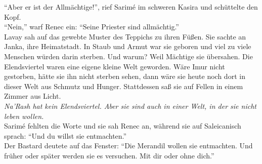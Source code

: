 ``Aber er ist der Allmächtige!'', rief Sarimé im schweren Kasira und schüttelte den Kopf.\\
``Nein,'' warf Renec ein: ``Seine Priester sind allmächtig.''\\
Lavay sah auf das gewebte Muster des Teppichs zu ihren Füßen. Sie sachte an Janka, ihre 
Heimatstadt. In Staub und Armut war sie geboren und viel zu viele Menschen würden darin sterben. 
Und warum? Weil Mächtige sie übersahen. Die Elendsviertel waren eine eigene kleine Welt geworden. 
Wäre Imur nicht gestorben, hätte sie ihn nicht sterben sehen, dann wäre sie heute noch dort in 
dieser Welt aus Schmutz und Hunger. Stattdessen saß sie auf Fellen in einem Zimmer aus Licht.\\
\textit{Na'Rash hat kein Elendsviertel. Aber sie sind auch in einer Welt, in der sie nicht leben 
wollen.}\\
Sarimé fehlten die Worte und sie sah Renec an, während sie auf Saleicanisch sprach: ``Und du willst 
sie entmachten.''\\
Der Bastard deutete auf das Fenster: ``Die Merandil wollen sie entmachten. Und früher oder später 
werden sie es versuchen. Mit dir oder ohne dich.''\\


